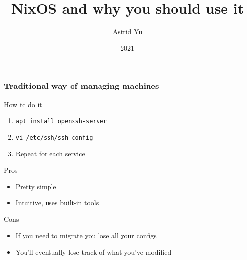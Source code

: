 \documentclass{beamer}
\title{NixOS and why you should use it}
\author{Astrid Yu}
\institute{Cal Poly Linux Users Group}
\date{2021}
\begin{document}
\frame{\titlepage}

\begin{frame}
    \frametitle{Traditional way of managing machines}

    \begin{block}{How to do it}
        \begin{enumerate}
            \item \texttt{apt install openssh-server}
            \item \texttt{vi /etc/ssh/ssh\_config}
            \item Repeat for each service
        \end{enumerate}
    \end{block}

    \pause

    \begin{alertblock}{Pros}
        \begin{itemize}
            \item Pretty simple
            \item Intuitive, uses built-in tools
        \end{itemize}
    \end{alertblock}

    \pause

    \begin{alertblock}{Cons}
        \begin{itemize}
            \item If you need to migrate you lose all your configs
            \item You'll eventually lose track of what you've modified
        \end{itemize}
    \end{alertblock}
\end{frame}
\end{document}
